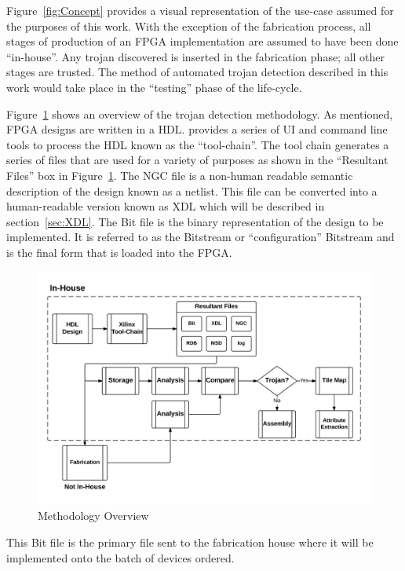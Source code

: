 Figure~\ref{fig:Concept} provides a visual representation of the use-case assumed for the purposes of this work. 
With the exception of the fabrication process, all stages of production of an \acrshort{FPGA} implementation are assumed to have been done ``in-house''. 
Any trojan discovered is inserted in the fabrication phase; all other stages are trusted.  
The method of automated trojan detection described in this work would take place in the ``testing'' phase of the life-cycle. 

Figure~\ref{fig:methodologyOverview} shows an overview of the trojan detection methodology.
As mentioned, \acrshort{FPGA} designs are written in a \acrfull{HDL}.
\Xilinx provides a series of \acrfull{UI} and command line tools to process the \acrshort{HDL} known as the ``tool-chain''.
The tool chain generates a series of files that are used for a variety of purposes as shown in the ``Resultant Files'' box in Figure~\ref{fig:methodologyOverview}.
The NGC file is a non-human readable semantic description of the design known as a netlist.
This file can be converted into a human-readable version known as \acrfull{XDL} which will be described in section~\ref{sec:XDL}.
The Bit file is the binary representation of the design to be implemented.
It is referred to as the \gls{Bitstream} or ``configuration'' \gls{Bitstream} and is the final form that is loaded into the \acrshort{FPGA}.
\begin{figure}
	\centering
	\includegraphics[width=1\linewidth]{Figures/methodologyOverview}
	\caption[Methodology Overview]{Methodology Overview}
	\label{fig:methodologyOverview}
\end{figure}
This Bit file is the primary file sent to the fabrication house where it will be implemented onto the batch of devices ordered.
